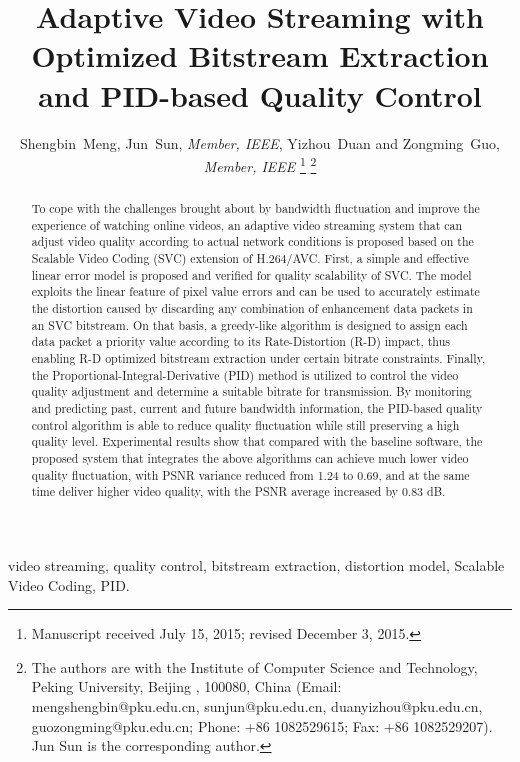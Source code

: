 \documentclass[journal]{IEEEtran}
\title{Adaptive Video Streaming with Optimized Bitstream Extraction and PID-based Quality Control}
\author{Shengbin~Meng, Jun~Sun, {\em Member, IEEE}, Yizhou~Duan and Zongming~Guo, {\em Member, IEEE} %
\thanks{Manuscript received July 15, 2015; revised December 3, 2015.}
\thanks{The authors are with the Institute of Computer Science and Technology, Peking University, Beijing%
, 100080, China (Email: mengshengbin@pku.edu.cn, sunjun@pku.edu.cn, duanyizhou@pku.edu.cn, guozongming@pku.edu.cn; Phone: +86 1082529615; Fax: +86 1082529207). Jun Sun is the corresponding author.}}
\begin{document}



\maketitle

\begin{abstract}
To cope with the challenges brought about by bandwidth fluctuation and improve the experience of watching online videos, an adaptive video streaming system that can adjust video quality according to actual network conditions is proposed based on the Scalable Video Coding (SVC) extension of H.264/AVC. First, a simple and effective linear error model is proposed and verified for quality scalability of SVC. The model exploits the linear feature of pixel value errors and can be used to accurately estimate the distortion caused by discarding any combination of enhancement data packets in an SVC bitstream. On that basis, a greedy-like algorithm is designed to assign each data packet a priority value according to its Rate-Distortion (R-D) impact, thus enabling R-D optimized bitstream extraction under certain bitrate constraints. Finally, the Proportional-Integral-Derivative (PID) method is utilized to control the video quality adjustment and determine a suitable bitrate for transmission. By monitoring and predicting past, current and future bandwidth information, the PID-based quality control algorithm is able to reduce quality fluctuation while still preserving a high quality level. Experimental results show that compared with the baseline software, the proposed system that integrates the above algorithms can achieve much lower video quality fluctuation, with PSNR variance reduced from 1.24 to 0.69, and at the same time deliver higher video quality, with the PSNR average increased by 0.83 dB.
\end{abstract}

\begin{IEEEkeywords}
video streaming, quality control, bitstream extraction, distortion model, Scalable Video Coding, PID.
\end{IEEEkeywords}



%
\IEEEpeerreviewmaketitle
\end{document}
